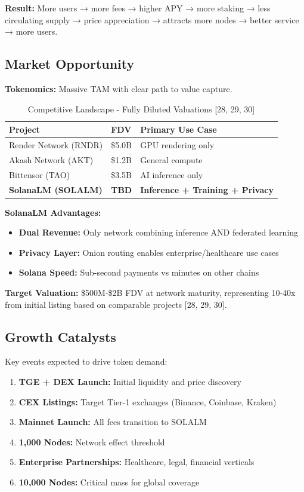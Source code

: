 \documentclass[11pt,a4paper]{article}
\begin{document}
\textbf{Result:} More users → more fees → higher APY → more staking → less circulating supply → price appreciation → attracts more nodes → better service → more users.

\subsection{Market Opportunity}

\textbf{Tokenomics:} Massive TAM with clear path to value capture.

\begin{table}[H]
\centering
\begin{tabular}{@{}lll@{}}
\toprule
\textbf{Project} & \textbf{FDV} & \textbf{Primary Use Case} \\
\midrule
Render Network (RNDR) & \$5.0B & GPU rendering only \\
Akash Network (AKT) & \$1.2B & General compute \\
Bittensor (TAO) & \$3.5B & AI inference only \\
\textbf{SolanaLM (SOLALM)} & \textbf{TBD} & \textbf{Inference + Training + Privacy} \\
\bottomrule
\end{tabular}
\caption{Competitive Landscape - Fully Diluted Valuations [28, 29, 30]}
\end{table}

\textbf{SolanaLM Advantages:}
\begin{itemize}
    \item \textbf{Dual Revenue:} Only network combining inference AND federated learning
    \item \textbf{Privacy Layer:} Onion routing enables enterprise/healthcare use cases
    \item \textbf{Solana Speed:} Sub-second payments vs minutes on other chains
\end{itemize}

\textbf{Target Valuation:} \$500M-\$2B FDV at network maturity, representing 10-40x from initial listing based on comparable projects [28, 29, 30].

\subsection{Growth Catalysts}

Key events expected to drive token demand:

\begin{enumerate}
    \item \textbf{TGE + DEX Launch:} Initial liquidity and price discovery
    \item \textbf{CEX Listings:} Target Tier-1 exchanges (Binance, Coinbase, Kraken)
    \item \textbf{Mainnet Launch:} All fees transition to SOLALM
    \item \textbf{1,000 Nodes:} Network effect threshold
    \item \textbf{Enterprise Partnerships:} Healthcare, legal, financial verticals
    \item \textbf{10,000 Nodes:} Critical mass for global coverage
\end{enumerate}
\end{document}
